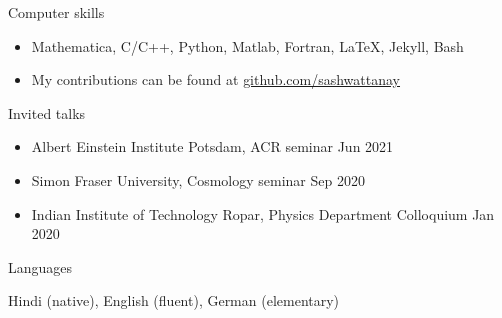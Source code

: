 \documentclass{resume} %
\begin{document}
  
  \pagebreak
 
   

\begin{rSection}{Computer skills}


\begin{itemize}
\item Mathematica, C/C++, Python, Matlab, Fortran, LaTeX, Jekyll, Bash
\item My contributions can be found at  \href{https://github.com/sashwattanay}{github.com/sashwattanay} 
\end{itemize}


\end{rSection}
  



\begin{rSection}{Invited talks}


\begin{itemize}
\item Albert Einstein Institute Potsdam, ACR seminar \hfill Jun 2021
\item Simon Fraser University, Cosmology seminar \hfill Sep 2020
\item Indian Institute of Technology Ropar, Physics Department Colloquium \hfill Jan 2020
\end{itemize}


\end{rSection}






\begin{rSection}{Languages}


Hindi (native), English (fluent), German (elementary)


\end{rSection}



\end{document}
